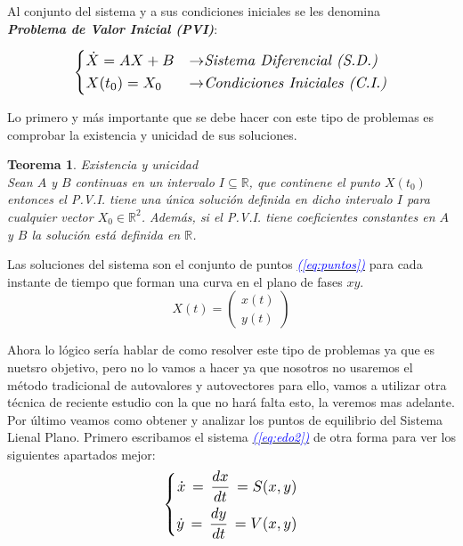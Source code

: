 \documentclass[12pt,a4paper]{report} %
\newtheorem{theorem}{Teorema}[chapter]
\newcommand{\eref}[1]{\hyperref[#1]{\textcolor{blue}{\textit{(\ref*{#1})}}}}
\begin{document}
	Al conjunto del sistema y a sus condiciones iniciales se les denomina \\ \textbf{\textit{Problema de Valor Inicial (PVI)}}: 
	
	\begin{equation}
	\label{eq:pvi}
	\scalebox{1.2}{$\displaystyle
		\left\{
		\begin{aligned}
			&\dot{X}=AX+B &\rightarrow& \textit{Sistema Diferencial (S.D.)}\\
			&X(t_0)=X_0 &\rightarrow& \textit{Condiciones Iniciales (C.I.)}
		\end{aligned}
		\right.
		$}
    \end{equation}\smallskip
	
	Lo primero y más importante que se debe hacer con este tipo de problemas es comprobar la existencia y unicidad de sus soluciones.
	\newpage
	\begin{theorem}\label{thm:interesante}
		Existencia y unicidad \\[2mm]
		\textit{Sean $A$ y $B$ continuas en un intervalo $I\subseteq  \mathbb{R}$, que continene el punto $X(t_0)$ entonces el P.V.I. tiene una única solución definida en dicho intervalo $I$ para cualquier vector $X_0 \in \mathbb{R}^2$}. Además, si el P.V.I. tiene coeficientes constantes en $A$ y $B$ la solución está definida en $\mathbb{R}$.
	\end{theorem}
	\vspace{4mm}
	
	Las soluciones del sistema son el conjunto de puntos \eref{eq:puntos} para cada instante de tiempo que forman una curva en el plano de fases $xy$.
	\begin{equation}
		\label{eq:puntos}
		X(t)=\begin{pmatrix}
			x(t) \\ y(t)
		\end{pmatrix}
	\end{equation}\smallskip
	
	Ahora lo lógico sería hablar de como resolver este tipo de problemas ya que es nuetsro objetivo, pero no lo vamos a hacer ya que nosotros no usaremos el método tradicional de autovalores y autovectores para ello, vamos a utilizar otra técnica de reciente estudio con la que no hará falta esto, la veremos mas adelante.\\[0.5cm]
	Por último veamos como obtener y analizar los puntos de equilibrio del Sistema Lienal Plano. Primero escribamos el sistema \eref{eq:edo2} de otra forma para ver los siguientes apartados mejor:
	\begin{equation}
		\label{eq:sv}
		\scalebox{1.2}{$\displaystyle
			\left\{
			\begin{aligned}
				\dot{x}\,=\,\frac{dx}{dt}\,=S(x,y) \\
				\dot{y}\,=\,\frac{dy}{dt}\,=V(x,y)
			\end{aligned}
			\right.
			$}
	\end{equation}\smallskip
	
\end{document}
